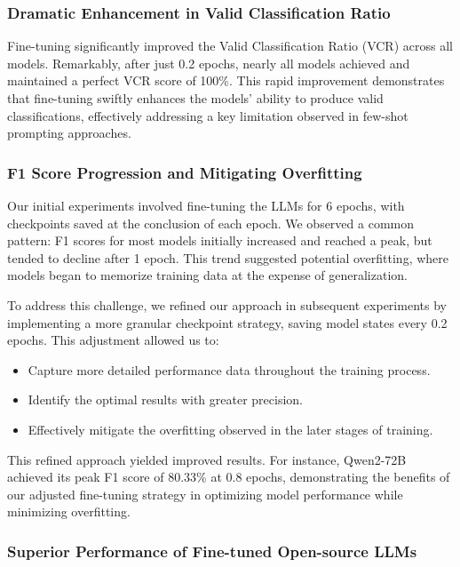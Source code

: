 \documentclass[conference]{IEEEtran}
\begin{document}
\subsubsection{Dramatic Enhancement in Valid Classification Ratio}
Fine-tuning significantly improved the Valid Classification Ratio (VCR) across all models. Remarkably, after just 0.2 epochs, nearly all models achieved and maintained a perfect VCR score of 100\%. This rapid improvement demonstrates that fine-tuning swiftly enhances the models' ability to produce valid classifications, effectively addressing a key limitation observed in few-shot prompting approaches.

\subsubsection{F1 Score Progression and Mitigating Overfitting}
Our initial experiments involved fine-tuning the LLMs for 6 epochs, with checkpoints saved at the conclusion of each epoch. We observed a common pattern: F1 scores for most models initially increased and reached a peak, but tended to decline after 1 epoch. This trend suggested potential overfitting, where models began to memorize training data at the expense of generalization.

To address this challenge, we refined our approach in subsequent experiments by implementing a more granular checkpoint strategy, saving model states every 0.2 epochs. This adjustment allowed us to:

\begin{itemize}
    \item Capture more detailed performance data throughout the training process.
    \item Identify the optimal results with greater precision.
    \item Effectively mitigate the overfitting observed in the later stages of training.
\end{itemize}

This refined approach yielded improved results. For instance, Qwen2-72B achieved its peak F1 score of 80.33\% at 0.8 epochs, demonstrating the benefits of our adjusted fine-tuning strategy in optimizing model performance while minimizing overfitting.

\subsubsection{Superior Performance of Fine-tuned Open-source LLMs}
\end{document}
